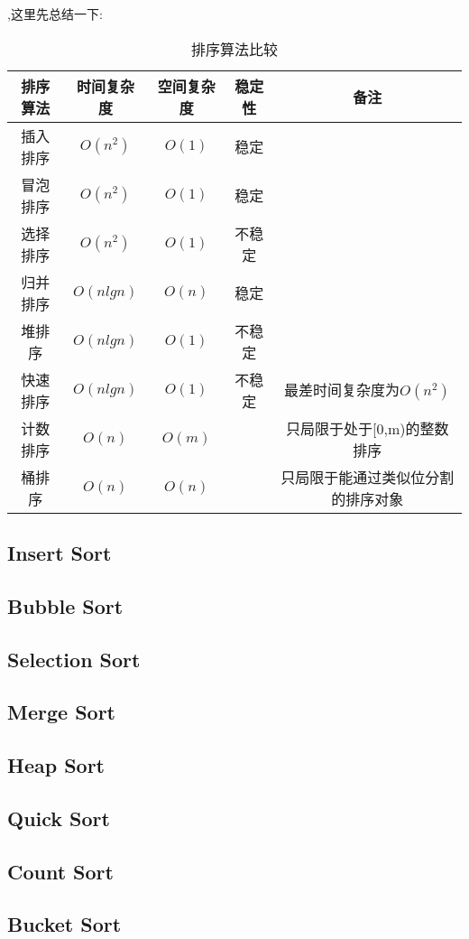     
,这里先总结一下:
\begin{table}[!hbp]
\begin{tabular}{|c|c|c|c|c|}
\hline
排序算法 & 时间复杂度 & 空间复杂度 & 稳定性 & 备注 \\
\hline
插入排序 & $O(n^2)$ & $O(1)$ & 稳定 &  \\
\hline
冒泡排序 & $O(n^2)$ & $O(1)$ & 稳定 &  \\
\hline
选择排序 & $O(n^2)$ & $O(1)$ & 不稳定 &  \\
\hline
归并排序 & $O(nlgn)$ & $O(n)$ & 稳定 &  \\
\hline
堆排序 & $O(nlgn)$ & $O(1)$ & 不稳定 &  \\
\hline
快速排序 & $O(nlgn)$ & $O(1)$ & 不稳定 & 最差时间复杂度为$O(n^2)$ \\
\hline
计数排序 & $O(n)$ & $O(m)$ &  & 只局限于处于[0,m)的整数排序\\
\hline
桶排序 & $O(n)$ & $O(n)$ &  & 只局限于能通过类似位分割的排序对象 \\
\hline
\end{tabular}
\caption{排序算法比较}
\end{table}

\subsection{Insert Sort}

\subsection{Bubble Sort}

\subsection{Selection Sort}

\subsection{Merge Sort}

\subsection{Heap Sort}

\subsection{Quick Sort}

\subsection{Count Sort}

\subsection{Bucket Sort}

